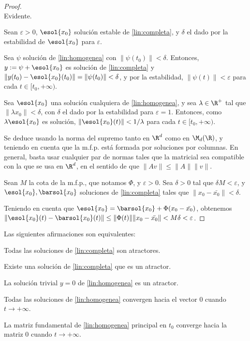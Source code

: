 \begin{proof}\hfill\\
  
   Evidente.
  
   Sean $\varepsilon > 0$, $\esol{x_0}$ solución estable de \ref{lin:completa},
  y $\delta$ el dado por la estabilidad de $\esol{x_0}$ para $\varepsilon$.
    
  Sea $\psi$ solución de \ref{lin:homogenea} con $\| \psi(t_0) \| < \delta$. Entonces, $y := \psi + \esol{x_0}$ es solución de \ref{lin:completa} y
  $\| y(t_0) - \esol{x_0}(t_0) \| = \| \psi(t_0) \| < \delta $, y por la estabilidad, $\| \psi(t) \| < \varepsilon$ para cada $t \in [t_0, +\infty)$.
    
   Sea $\esol{x_0}$ una solución cualquiera de \ref{lin:homogenea}, y sea $\lambda \in \R^+$ tal que $\| \lambda x_0 \| < \delta$, con $\delta$
    el dado por la estabilidad para $\varepsilon = 1$. Entonces, como $\lambda\esol{x_0}$ es solución, $\| \esol{x_0}(t) \| < 1 / \lambda$ para cada $t \in [t_0, +\infty)$.

   Se deduce usando la norma del supremo tanto en $\R^d$ como en $\M_d(\R)$, y teniendo en cuenta que la m.f.p. está formada por soluciones por columnas. En general,
  basta usar cualquier par de normas tales que la matricial sea compatible con la que se usa en $\R^d$, en el sentido de que $\| Av \| \le \| A \| \|v\|$.

   Sean $M$ la cota de la m.f.p., que notamos $\Phi$, y $\varepsilon > 0$.
  Sea $\delta > 0$ tal que $\delta M < \varepsilon$, y $\esol{x_0}, \barsol{x_0}$ soluciones de \ref{lin:completa} tales que $\| x_0 - \bar{x_0} \| < \delta$.
  
  Teniendo en cuenta que $\esol{x_0} = \barsol{x_0} + \Phi(x_0 - \bar{x_0})$, obtenemos $\| \esol{x_0}(t) - \barsol{x_0}(t) \| \le \| \Phi(t) \| \| x_0 - \bar{x_0} \| < M\delta < \varepsilon$.
\end{proof}

\begin{nprop}
Las siguientes afirmaciones son equivalentes:
\begin{nlist}
\item Todas las soluciones de \ref{lin:completa} son atractores.
\item Existe una solución de \ref{lin:completa} que es un atractor.
\item La solución trivial $y = 0$ de \ref{lin:homogenea} es un atractor.
\item Todas las soluciones de \ref{lin:homogenea} convergen hacia el vector 0 cuando $t \to +\infty$.
\item La matriz fundamental de \ref{lin:homogenea} principal en $t_0$ converge hacia la matriz 0 cuando $t \to +\infty$.
\end{nlist}
\end{nprop}

